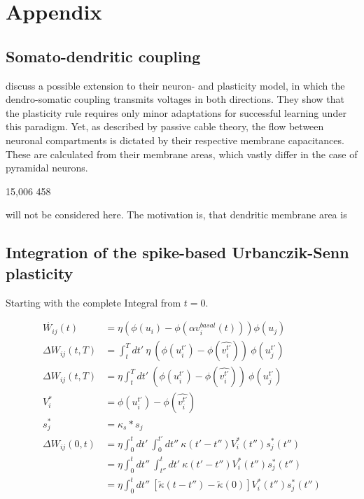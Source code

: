 
\chapter{Appendix}



\section{Somato-dendritic coupling}\label{sec-somato-dendr}

\citep{urbanczik2014learning} discuss a possible extension to their neuron- and plasticity model, in which the
dendro-somatic coupling transmits voltages in both directions. They show that the plasticity rule requires only minor
adaptations for successful learning under this paradigm. Yet, as described by passive cable theory, the flow between
neuronal compartments is dictated by their respective membrane capacitances. These are calculated from their membrane
areas, which vastly differ in the case of pyramidal neurons. 


15,006 458


will not be considered here. The motivation is, that dendritic membrane area is


\section{Integration of the spike-based Urbanczik-Senn plasticity}



Starting with the complete Integral from $t=0$.

\begin{align}
  \dot{W_{ij}}(t)    & = \eta (\phi(u_i) - \phi(\alpha v^{basal}_i(t))) \phi(u_j)                                                     \\
  \Delta W_{ij}(t,T) & = \int_t^T dt' \ \eta \  (\phi(u_i^{t'}) - \phi(\widehat{v_i^{t'}})) \  \phi(u_j^{t'})                         \\
  \Delta W_{ij}(t,T) & = \eta \int_t^T dt' \  (\phi(u_i^{t'}) - \phi(\widehat{v_i^{t'}})) \ \phi(u_j^{t'})                            \\
  V_i^*              & = \phi(u_i^{t'}) - \phi(\widehat{v_i^{t'}})                                                                    \\
  s_j^*              & = \kappa_s * s_j                                                                                               \\
  \Delta W_{ij}(0,t) & =\eta \int_0^t dt' \  \int_0^{t'} dt'' \ \kappa(t'-t'') V_i^\ast (t'') s_j^\ast (t'')                          \\
                     & = \eta \int_0^t dt'' \  \int_{t''}^{t} dt' \ \kappa(t'-t'') V_i^\ast (t'') s_j^\ast (t'')                      \\
                     & = \eta \int_0^t dt'' \  \left[ \tilde{\kappa}(t-t'') - \tilde{\kappa}(0) \right] V_i^\ast (t'') s_j^\ast (t'') \\
\end{align}

